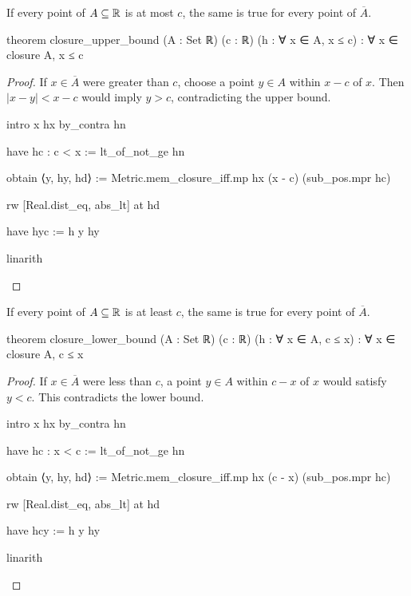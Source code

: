 \begin{lemma}
  \label{an1:lem:closure-upper-bound}
  If every point of $A\subseteq\mathbb{R}$ is at most $c$, the same is true for every point of $\overline
    A$.

  \begin{lean}
    theorem closure_upper_bound (A : Set ℝ) (c : ℝ) (h : ∀ x ∈ A, x ≤ c) :
        ∀ x ∈ closure A, x ≤ c
  \end{lean}
\end{lemma}

\begin{proof}
  If $x\in\overline A$ were greater than $c$, choose a point $y\in A$ within $x-c$ of $x$.
  Then $|x-y|<x-c$ would imply $y>c$, contradicting the upper bound.

  \begin{lean}
    intro x hx
    by_contra hn

    have hc : c < x := lt_of_not_ge hn

    obtain ⟨y, hy, hd⟩ := Metric.mem_closure_iff.mp hx (x - c) (sub_pos.mpr hc)

    rw [Real.dist_eq, abs_lt] at hd

    have hyc := h y hy

    linarith
  \end{lean}

\end{proof}

\begin{lemma}
  \label{an1:lem:closure-lower-bound}
  If every point of $A\subseteq\mathbb{R}$ is at least $c$, the same is true for every point of $\overline
    A$.

  \begin{lean}
    theorem closure_lower_bound (A : Set ℝ) (c : ℝ) (h : ∀ x ∈ A, c ≤ x) :
        ∀ x ∈ closure A, c ≤ x
  \end{lean}
\end{lemma}

\begin{proof}
  If $x\in\overline A$ were less than $c$, a point $y\in A$ within $c-x$ of $x$ would satisfy
  $y<c$.
  This contradicts the lower bound.

  \begin{lean}
    intro x hx
    by_contra hn

    have hc : x < c := lt_of_not_ge hn

    obtain ⟨y, hy, hd⟩ := Metric.mem_closure_iff.mp hx (c - x) (sub_pos.mpr hc)

    rw [Real.dist_eq, abs_lt] at hd

    have hcy := h y hy

    linarith
  \end{lean}

\end{proof}

